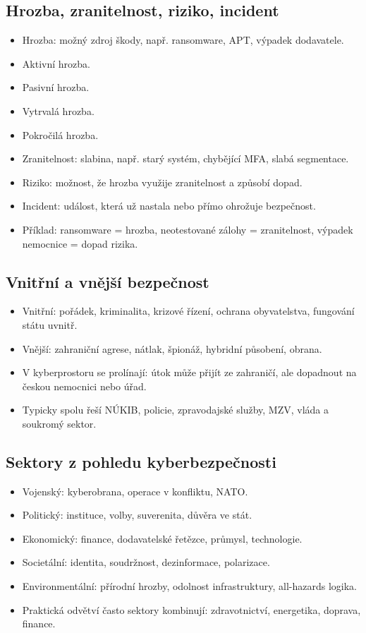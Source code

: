 \documentclass[10pt,a4paper]{article}
\newcommand{\blok}[1]{\subsection*{#1}}
\begin{document}
\blok{Hrozba, zranitelnost, riziko, incident}
\begin{itemize}
  \item Hrozba: možný zdroj škody, např. ransomware, APT, výpadek dodavatele.
  \item Aktivní hrozba.
  \item Pasivní hrozba.
  \item Vytrvalá hrozba.
  \item Pokročilá hrozba.
  \item Zranitelnost: slabina, např. starý systém, chybějící MFA, slabá segmentace.
  \item Riziko: možnost, že hrozba využije zranitelnost a způsobí dopad.
  \item Incident: událost, která už nastala nebo přímo ohrožuje bezpečnost.
  \item Příklad: ransomware = hrozba, neotestované zálohy = zranitelnost, výpadek nemocnice = dopad rizika.
\end{itemize}

\blok{Vnitřní a vnější bezpečnost}
\begin{itemize}
  \item Vnitřní: pořádek, kriminalita, krizové řízení, ochrana obyvatelstva, fungování státu uvnitř.
  \item Vnější: zahraniční agrese, nátlak, špionáž, hybridní působení, obrana.
  \item V kyberprostoru se prolínají: útok může přijít ze zahraničí, ale dopadnout na českou nemocnici nebo úřad.
  \item Typicky spolu řeší NÚKIB, policie, zpravodajské služby, MZV, vláda a soukromý sektor.
\end{itemize}

\blok{Sektory z pohledu kyberbezpečnosti}
\begin{itemize}
  \item Vojenský: kyberobrana, operace v konfliktu, NATO.
  \item Politický: instituce, volby, suverenita, důvěra ve stát.
  \item Ekonomický: finance, dodavatelské řetězce, průmysl, technologie.
  \item Societální: identita, soudržnost, dezinformace, polarizace.
  \item Environmentální: přírodní hrozby, odolnost infrastruktury, all-hazards logika.
  \item Praktická odvětví často sektory kombinují: zdravotnictví, energetika, doprava, finance.
\end{itemize}
\end{document}
